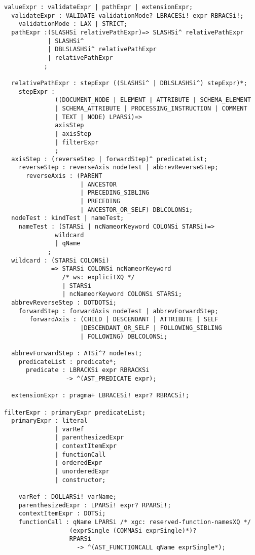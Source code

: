 \begin{Verbatim}[frame=none, fontsize=\footnotesize]
valueExpr : validateExpr | pathExpr | extensionExpr;
  validateExpr : VALIDATE validationMode? LBRACESi! expr RBRACSi!;
    validationMode : LAX | STRICT;
  pathExpr :(SLASHSi relativePathExpr)=> SLASHSi^ relativePathExpr
            | SLASHSi^
            | DBLSLASHSi^ relativePathExpr
            | relativePathExpr
           ;

  relativePathExpr : stepExpr ((SLASHSi^ | DBLSLASHSi^) stepExpr)*;
    stepExpr :
              ((DOCUMENT_NODE | ELEMENT | ATTRIBUTE | SCHEMA_ELEMENT 
              | SCHEMA_ATTRIBUTE | PROCESSING_INSTRUCTION | COMMENT 
              | TEXT | NODE) LPARSi)=> 
              axisStep
              | axisStep
              | filterExpr
              ;
  axisStep : (reverseStep | forwardStep)^ predicateList;
    reverseStep : reverseAxis nodeTest | abbrevReverseStep;
      reverseAxis : (PARENT 
                     | ANCESTOR 
                     | PRECEDING_SIBLING 
                     | PRECEDING 
                     | ANCESTOR_OR_SELF) DBLCOLONSi;
  nodeTest : kindTest | nameTest;
    nameTest : (STARSi | ncNameorKeyword COLONSi STARSi)=>
              wildcard
              | qName 
            ;
  wildcard : (STARSi COLONSi) 
             => STARSi COLONSi ncNameorKeyword
                /* ws: explicitXQ */
                | STARSi
                | ncNameorKeyword COLONSi STARSi;
  abbrevReverseStep : DOTDOTSi;
    forwardStep : forwardAxis nodeTest | abbrevForwardStep;
       forwardAxis : (CHILD | DESCENDANT | ATTRIBUTE | SELF 
                     |DESCENDANT_OR_SELF | FOLLOWING_SIBLING 
                     | FOLLOWING) DBLCOLONSi;

  abbrevForwardStep : ATSi^? nodeTest;
    predicateList : predicate*;
      predicate : LBRACKSi expr RBRACKSi
                 -> ^(AST_PREDICATE expr);

  extensionExpr : pragma+ LBRACESi! expr? RBRACSi!; 

filterExpr : primaryExpr predicateList;
  primaryExpr : literal 
              | varRef 
              | parenthesizedExpr 
              | contextItemExpr 
              | functionCall 
              | orderedExpr 
              | unorderedExpr 
              | constructor;

    varRef : DOLLARSi! varName;
    parenthesizedExpr : LPARSi! expr? RPARSi!;
    contextItemExpr : DOTSi;
    functionCall : qName LPARSi /* xgc: reserved-function-namesXQ */
                  (exprSingle (COMMASi exprSingle)*)? 
                  RPARSi
                    -> ^(AST_FUNCTIONCALL qName exprSingle*);


\end{Verbatim}
